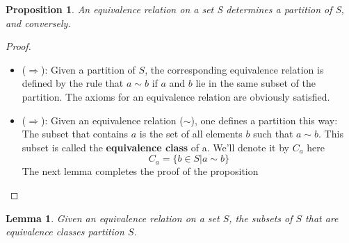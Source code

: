 \documentclass[
]{book}
\providecommand{\tightlist}{%
  \setlength{\itemsep}{0pt}\setlength{\parskip}{0pt}}
\newtheorem{lemma}{Lemma}[chapter]
\newtheorem{proposition}{Proposition}[chapter]
\theoremstyle{definition}
\theoremstyle{definition}
\theoremstyle{definition}
\theoremstyle{definition}
\theoremstyle{remark}
\begin{document}
\begin{proposition}
\protect\hypertarget{prp:unnamed-chunk-22}{}\label{prp:unnamed-chunk-22}An equivalence relation on a set S determines a partition of S, and conversely.
\end{proposition}

\begin{proof}
\leavevmode

\begin{itemize}
\tightlist
\item
  (\(\Longrightarrow\)): Given a partition of \(S\), the corresponding equivalence relation is defined by the rule
  that \(a \sim b\) if \(a\) and \(b\) lie in the same subset of the partition. The axioms for an equivalence relation are obviously satisfied.
\item
  (\(\Longrightarrow\)): Given an equivalence relation (\(\sim\)), one defines a partition this way:\\
  The subset that contains \(a\) is the set of all elements \(b\) such that \(a \sim b\). This subset is called the \textbf{equivalence class} of a. We'll denote it by \(C_a\) here
  \[C_a = \{b \in S | a\sim b\}\]
  The next lemma completes the proof of the proposition
\end{itemize}

\end{proof}

\begin{lemma}
\protect\hypertarget{lem:unnamed-chunk-24}{}\label{lem:unnamed-chunk-24}Given an equivalence relation on a set \(S\), the subsets of \(S\) that are equivalence classes partition \(S\).
\end{lemma}
\end{document}
